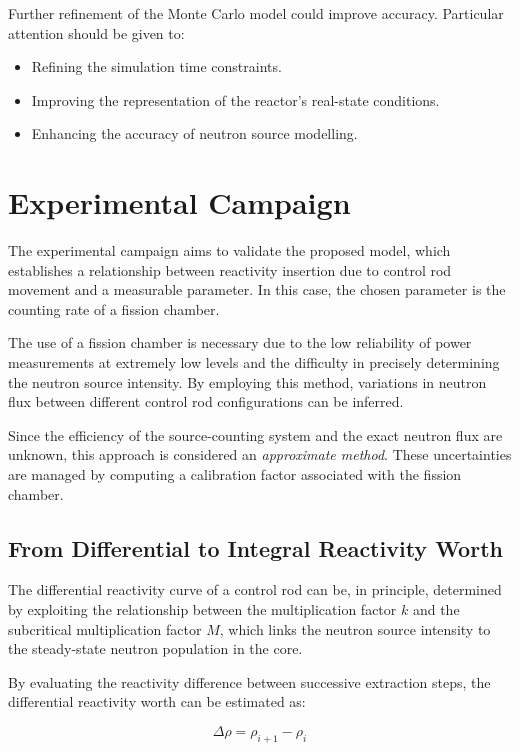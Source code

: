 Further refinement of the Monte Carlo model could improve accuracy. Particular attention should be given to:

\begin{itemize}
    \item Refining the simulation time constraints.
    \item Improving the representation of the reactor’s real-state conditions.
    \item Enhancing the accuracy of neutron source modelling.
\end{itemize}
\section{Experimental Campaign}

The experimental campaign aims to validate the proposed model, which establishes a relationship between reactivity insertion due to control rod movement and a measurable parameter. In this case, the chosen parameter is the counting rate of a fission chamber.

The use of a fission chamber is necessary due to the low reliability of power measurements at extremely low levels and the difficulty in precisely determining the neutron source intensity. By employing this method, variations in neutron flux between different control rod configurations can be inferred.

Since the efficiency of the source-counting system and the exact neutron flux are unknown, this approach is considered an \textit{approximate method}. These uncertainties are managed by computing a calibration factor associated with the fission chamber.
\subsection{From Differential to Integral Reactivity Worth}

The differential reactivity curve of a control rod can be, in principle, determined by exploiting the relationship between the multiplication factor $k$ and the subcritical multiplication factor $M$, which links the neutron source intensity to the steady-state neutron population in the core.

By evaluating the reactivity difference between successive extraction steps, the differential reactivity worth can be estimated as:

\begin{equation}
\Delta \rho = \rho_{i+1} - \rho_i
\end{equation}

